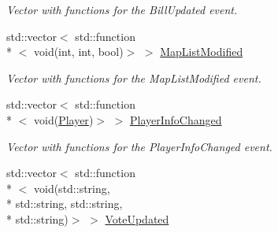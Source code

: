 \begin{DoxyCompactItemize}
\begin{DoxyCompactList}\small\item\em Vector with functions for the Bill\-Updated event. \end{DoxyCompactList}\item 
\hypertarget{classPlugin_aed57b8e5c978e9de385e165a1668e63e}{std\-::vector$<$ std\-::function\\*
$<$ void(int, int, bool)$>$ $>$ \hyperlink{classPlugin_aed57b8e5c978e9de385e165a1668e63e}{Map\-List\-Modified}}\label{classPlugin_aed57b8e5c978e9de385e165a1668e63e}

\begin{DoxyCompactList}\small\item\em Vector with functions for the Map\-List\-Modified event. \end{DoxyCompactList}\item 
\hypertarget{classPlugin_a2836f95c56beafd0fa2b62f7693a9f3c}{std\-::vector$<$ std\-::function\\*
$<$ void(\hyperlink{structPlayer}{Player})$>$ $>$ \hyperlink{classPlugin_a2836f95c56beafd0fa2b62f7693a9f3c}{Player\-Info\-Changed}}\label{classPlugin_a2836f95c56beafd0fa2b62f7693a9f3c}

\begin{DoxyCompactList}\small\item\em Vector with functions for the Player\-Info\-Changed event. \end{DoxyCompactList}\item 
\hypertarget{classPlugin_a869a88fc900c8a54c2607774cfa44dbc}{std\-::vector$<$ std\-::function\\*
$<$ void(std\-::string, \\*
std\-::string, std\-::string, \\*
std\-::string)$>$ $>$ \hyperlink{classPlugin_a869a88fc900c8a54c2607774cfa44dbc}{Vote\-Updated}}\label{classPlugin_a869a88fc900c8a54c2607774cfa44dbc}


\end{DoxyCompactItemize}
